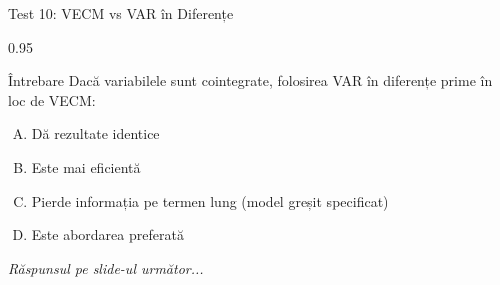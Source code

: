 \documentclass[9pt, aspectratio=169, t]{beamer}
\begin{document}
\begin{frame}{Test 10: VECM vs VAR în Diferențe}
    \begin{cminipage}{0.95\textwidth}
    \begin{alertblock}{Întrebare}
        Dacă variabilele sunt cointegrate, folosirea VAR în diferențe prime în loc de VECM:
    \end{alertblock}

    \vspace{0.3cm}

    \begin{enumerate}[A)]\setlength{\itemsep}{0pt}
        \item Dă rezultate identice
        \item Este mai eficientă
        \item Pierde informația pe termen lung (model greșit specificat)
        \item Este abordarea preferată
    \end{enumerate}

    \vspace{0.5cm}
    \begin{flushright}\textit{Răspunsul pe slide-ul următor...}\end{flushright}
    \end{cminipage}
\end{frame}
\end{document}
